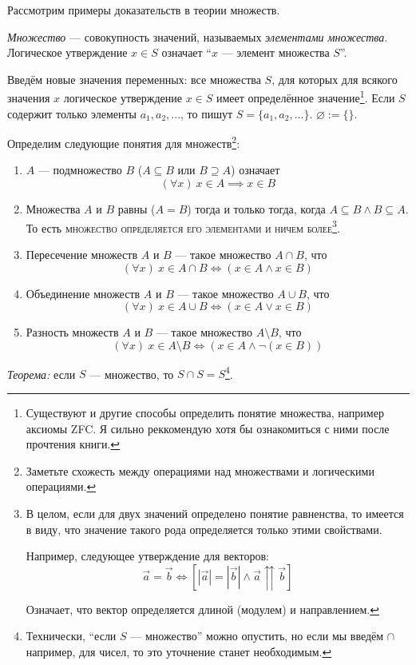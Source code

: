 Рассмотрим примеры доказательств в теории множеств.

{\it Множество} --- совокупность значений, называемых {\it элементами множества}.
Логическое утверждение $x\in S$ означает ``$x$ --- элемент множества $S$''.

Введём новые значения переменных: все множества $S$, для которых для
всякого значения $x$ логическое утверждение ${x\in S}$ имеет определённое
значение\footnote{Существуют и другие способы определить
	понятие множества, например аксиомы ZFC. Я сильно реккомендую
	хотя бы ознакомиться с ними после прочтения книги.}.
Если $S$ содержит только элементы $a_1,a_2,...$, то пишут $S=\{a_1,a_2,...\}$.
$\varnothing:=\{\}$.

Определим следующие понятия для множеств\footnote{Заметьте схожесть между операциями
	над множествами и логическими операциями.}:
\begin{enumerate}
	\item{}$A$ --- подмножество $B$ (${A\subseteq B}$ или $B\supseteq A$) означает
	\[
		(\forall x)~x\in A\implies x\in B
	\]

	\item{}Множества $A$ и $B$ равны ($A=B$) тогда и только тогда, когда
	$A\subseteq B\land B\subseteq A$.
	То есть \textsc{множество определяется его элементами и ничем более}\footnote{
		В целом, если для двух значений определено понятие равненства,
		то имеется в виду, что значение такого рода определяется только этими
		свойствами.

		Например, следующее утверждение для векторов:
		\[
			\vec{a}=\vec{b}\iff\left[|\vec{a}|=|\vec{b}|\land
				\vec{a}\upuparrows\vec{b}\right]
		\]

		Означает, что вектор определяется длиной (модулем) и направлением.
	}.

	\item{}Пересечение множеств $A$ и $B$ --- такое множество $A\cap B$, что
	\[
		(\forall x)~x\in A\cap B\iff(x\in A\land x\in B)
	\]

	\item{}Объединение множеств $A$ и $B$ --- такое множество $A\cup B$, что
	\[
		(\forall x)~x\in A\cup B\iff (x\in A\lor x\in B)
	\]

	\item{}Разность множеств $A$ и $B$ --- такое множество $A\setminus B$, что
	\[
		(\forall x)~x\in A\setminus B\iff (x\in A\land \lnot(x\in B))
	\]
\end{enumerate}

{\it Теорема:} если $S$ --- множество, то $S\cap S=S$\footnote{
	Технически, ``если $S$ --- множество'' можно опустить, но если
	мы введём $\cap$ например, для чисел, то это уточнение станет необходимым.
}.

